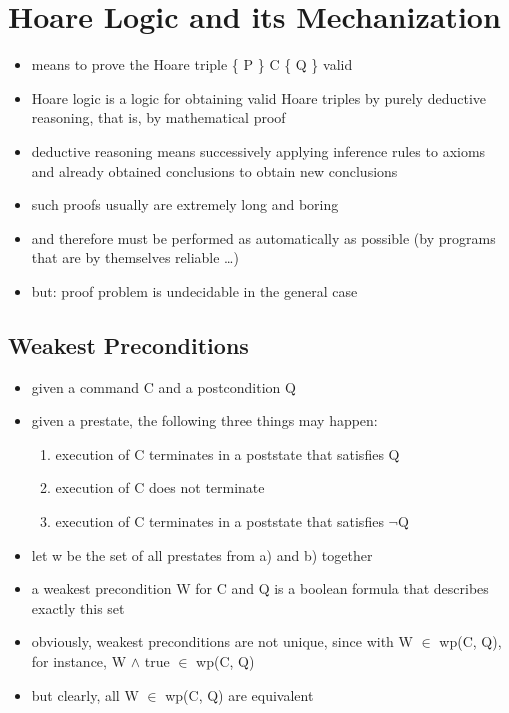 \hypertarget{hoare-logic-and-its-mechanization}{%
\section{Hoare Logic and its
Mechanization}\label{hoare-logic-and-its-mechanization}}

\begin{itemize}
\tightlist
\item
  means to prove the Hoare triple \{ P \} C \{ Q \} valid
\item
  Hoare logic is a logic for obtaining valid Hoare triples by purely
  deductive reasoning, that is, by mathematical proof
\item
  deductive reasoning means successively applying inference rules to
  axioms and already obtained conclusions to obtain new conclusions
\item
  such proofs usually are extremely long and boring
\item
  and therefore must be performed as automatically as possible (by
  programs that are by themselves reliable \ldots{})
\item
  but: proof problem is undecidable in the general case
\end{itemize}

\hypertarget{weakest-preconditions}{%
\subsection{Weakest Preconditions}\label{weakest-preconditions}}

\begin{itemize}
\tightlist
\item
  given a command C and a postcondition Q
\item
  given a prestate, the following three things may happen:

  \begin{enumerate}
  \def\labelenumi{\alph{enumi})}
  \tightlist
  \item
    execution of C terminates in a poststate that satisfies Q
  \item
    execution of C does not terminate
  \item
    execution of C terminates in a poststate that satisfies $\neg$Q
  \end{enumerate}
\item
  let w be the set of all prestates from a) and b) together
\item
  a weakest precondition W for C and Q is a boolean formula that
  describes exactly this set
\item
  obviously, weakest preconditions are not unique, since with W $\in$ wp(C,
  Q), for instance, W $\land$ true $\in$ wp(C, Q)
\item
  but clearly, all W $\in$ wp(C, Q) are equivalent
\end{itemize}

